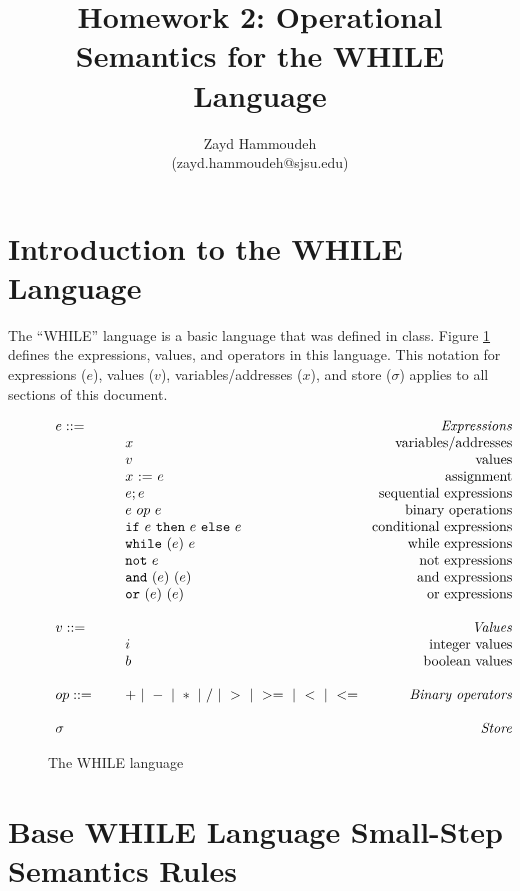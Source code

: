 \documentclass{article}
\title{Homework 2: Operational Semantics for the WHILE Language}
\author{
  Zayd Hammoudeh \\
  (zayd.hammoudeh@sjsu.edu)
  }
\date{}
\newcommand{\rel}[1]{ \mbox{\sc [#1]} }
\newcommand{\mydefhead}[2]{\multicolumn{2}{l}{{#1}}&\mbox{\emph{#2}}\\}
\newcommand{\mydefcase}[2]{\qquad\qquad& #1 &\mbox{#2}\\}
\newcommand{\assign}[2]{#1~{:=}~#2}
\newcommand{\ife}[3]{\mbox{\tt if}~{#1}~\mbox{\tt then}~{#2}~\mbox{\tt else}~{#3}}
\newcommand{\whilee}[2]{\mbox{\tt while}~(#1)~#2}
\newcommand{\note}[1]{\mbox{\tt not}~#1}
\newcommand{\ande}[2]{\mbox{\tt and}~(#1)~(#2)}
\newcommand{\ore}[2]{\mbox{\tt or}~(#1)~(#2)}
\begin{document}
\maketitle

\section{Introduction to the WHILE Language}

The ``WHILE'' language is a basic language that was defined in class.  Figure \ref{fig:lang} defines the expressions, values, and operators in this language.  This notation for expressions ($e$), values ($v$), variables/addresses ($x$), and store ($\sigma$) applies to all sections of this document.

\newcommand{\ssrule}[3]{
  \rel{#1} &
  \frac{\strut\begin{array}{@{}c@{}} #2 \end{array}}
       {\strut\begin{array}{@{}c@{}} #3 \end{array}}
   \\~\\
}
\newcommand{\sstep}[4]{{#1},{#2} \rightarrow {#3},{#4}}
\newcommand{\sstepraw}[4]{{#1},{#2} \rightarrow {#3},{#4}}
\begin{figure}[H]\label{fig:lang}
\caption{The WHILE language}
\[
\begin{array}{llr}
  \mydefhead{e ::=\qquad\qquad\qquad\qquad}{Expressions}
  \mydefcase{x}{variables/addresses}
  \mydefcase{v}{values}
  \mydefcase{\assign x e}{assignment}
  \mydefcase{e; e}{sequential expressions}
  \mydefcase{e ~op~ e}{binary operations}
  \mydefcase{\ife e e e}{conditional expressions}
  \mydefcase{\whilee e e}{while expressions}
  \mydefcase{\note e}{not expressions}
  \mydefcase{\ande e e}{and expressions}
  \mydefcase{\ore e e}{or expressions}
  \\
  \mydefhead{v ::=\qquad\qquad\qquad\qquad}{Values}
  \mydefcase{i}{integer values}
  \mydefcase{b}{boolean values}
  \\
  op ::= & + ~|~ - ~|~ * ~|~ / ~|~ > ~|~ >= ~|~ < ~|~ <=  & \mbox{\emph{Binary operators}} 
  \\
  \\
  \mydefhead{\sigma}{Store} 
\end{array}
\]
\end{figure}


\section{Base WHILE Language Small-Step Semantics Rules}
\end{document}
